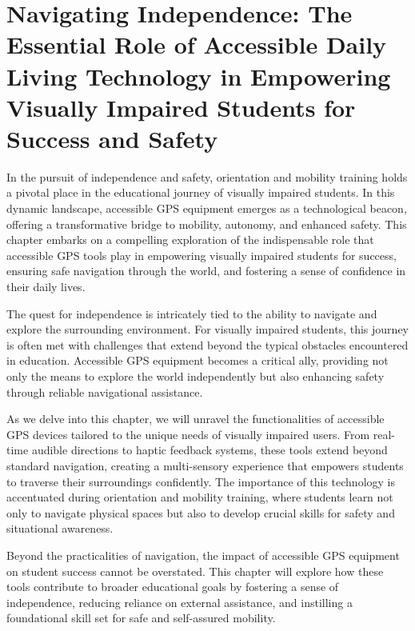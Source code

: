 \hypertarget{accessible-gps-mapping}{}\chapter[\raggedright Navigating Independence:\hfill\break The Essential Role of Accessible Daily Living Technology in\hfill\break Empowering Visually Impaired Students for Success and Safety]{Navigating Independence: The Essential Role of Accessible Daily Living Technology in Empowering Visually Impaired Students for Success and Safety}\label{accessible-gps-mapping}
\noindent\makebox[\linewidth]{\rule{\linewidth}{0.4pt}}
{\let\clearpage\relax\localtableofcontents\let\clearpage\relax\locallistoftables}\newpage
{}
In the pursuit of independence and safety, orientation and mobility training holds a pivotal place in the educational journey of visually impaired students. In this dynamic landscape, accessible GPS equipment emerges as a technological beacon, offering a transformative bridge to mobility, autonomy, and enhanced safety. This chapter embarks on a compelling exploration of the indispensable role that accessible GPS tools play in empowering visually impaired students for success, ensuring safe navigation through the world, and fostering a sense of confidence in their daily lives.

The quest for independence is intricately tied to the ability to navigate and explore the surrounding environment. For visually impaired students, this journey is often met with challenges that extend beyond the typical obstacles encountered in education. Accessible GPS equipment becomes a critical ally, providing not only the means to explore the world independently but also enhancing safety through reliable navigational assistance.

As we delve into this chapter, we will unravel the functionalities of accessible GPS devices tailored to the unique needs of visually impaired users. From real-time audible directions to haptic feedback systems, these tools extend beyond standard navigation, creating a multi-sensory experience that empowers students to traverse their surroundings confidently. The importance of this technology is accentuated during orientation and mobility training, where students learn not only to navigate physical spaces but also to develop crucial skills for safety and situational awareness.

Beyond the practicalities of navigation, the impact of accessible GPS equipment on student success cannot be overstated. This chapter will explore how these tools contribute to broader educational goals by fostering a sense of independence, reducing reliance on external assistance, and instilling a foundational skill set for safe and self-assured mobility.

